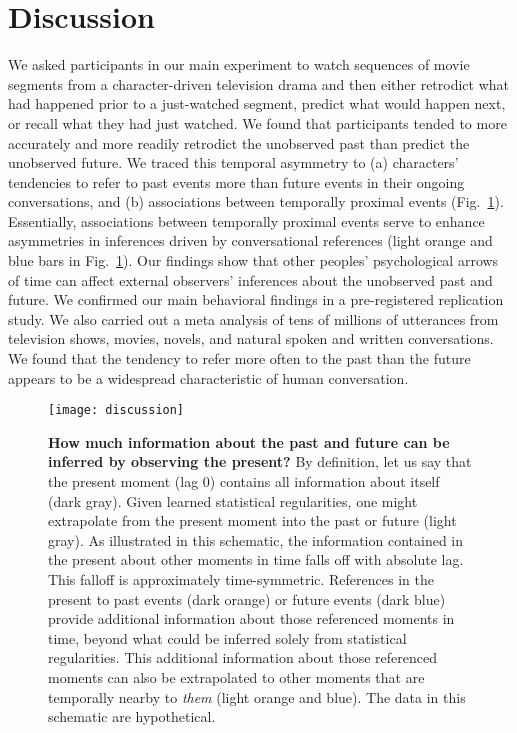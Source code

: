\documentclass[10pt]{article}
\begin{document}
\section*{Discussion}

We asked participants in our main experiment to watch sequences of movie segments from a character-driven television drama and then either retrodict what had happened prior to a just-watched segment, predict what would happen next, or recall what they had just watched. We found that participants tended to more accurately and more readily retrodict the unobserved past than predict the unobserved future. We traced this temporal asymmetry to (a) characters' tendencies to refer to past events more than future events in their ongoing conversations, and (b) associations between temporally proximal events (Fig.~\ref{fig:discussion}). Essentially, associations between temporally proximal events serve to enhance asymmetries in inferences driven by conversational references (light orange and blue bars in Fig.~\ref{fig:discussion}). Our findings show that other peoples' psychological arrows of time can affect external observers' inferences about the unobserved past and future. We confirmed our main behavioral findings in a pre-registered replication study. We also carried out a meta analysis of tens of millions of utterances from television shows, movies, novels, and natural spoken and written conversations. We found that the tendency to refer more often to the past than the future appears to be a widespread characteristic of human conversation.

\begin{figure}[tp]
  \centering
  \texttt{[image: discussion]}

  \caption{\textbf{How much information about the past and future can be inferred by observing the present?} By definition, let us say that the present moment (lag 0) contains all information about itself (dark gray). Given learned statistical regularities, one might extrapolate from the present moment into the past or future (light gray). As illustrated in this schematic, the information contained in the present about other moments in time falls off with absolute lag. This falloff is approximately time-symmetric. References in the present to past events (dark orange) or future events (dark blue) provide additional information about those referenced moments in time, beyond what could be inferred solely from statistical regularities. This additional information about those referenced moments can also be extrapolated to other moments that are temporally nearby to \textit{them} (light orange and blue). The data in this schematic are hypothetical.}

  \label{fig:discussion}
\end{figure}
\end{document}
